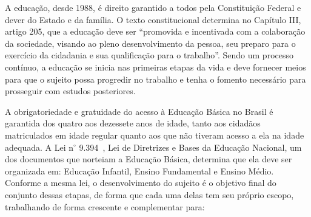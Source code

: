 A educação, desde 1988, é direito garantido a todos pela Constituição Federal e dever do Estado e da família. O texto constitucional determina no Capítulo III, artigo 205, que a educação deve ser “promovida e incentivada com a colaboração da sociedade, visando ao pleno desenvolvimento da pessoa, seu preparo para o exercício da cidadania e sua qualificação para o trabalho”. Sendo um processo contínuo, a educação se inicia nas primeiras etapas da vida e deve fornecer meios para que o sujeito possa progredir no trabalho e tenha o fomento necessário para prosseguir com estudos posteriores.

A obrigatoriedade e gratuidade do acesso à Educação Básica no Brasil é garantida dos quatro aos dezessete anos de idade, tanto aos cidadãos matriculados em idade regular quanto aos que não tiveram acesso a ela na idade adequada. A Lei n$^{\circ}$ 9.394~\cite{brasil_lei_1996}, Lei de Diretrizes e Bases da Educação Nacional, um dos documentos que norteiam a Educação Básica, determina que ela deve ser organizada em: Educação Infantil, Ensino Fundamental e Ensino Médio. Conforme a mesma lei, o desenvolvimento do sujeito é o objetivo final do conjunto dessas etapas, de forma que cada uma delas tem seu próprio escopo, trabalhando de forma crescente e complementar para:

